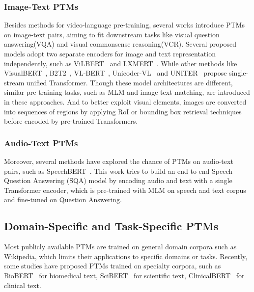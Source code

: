 \documentclass[fleqn]{SCYE-arxiv}
\begin{document}
\begin{multicols}{2}
\subsubsection{Image-Text PTMs}

Besides methods for video-language pre-training, several works introduce PTMs on image-text pairs, aiming to fit downstream tasks like visual question answering(VQA) and visual commonsense reasoning(VCR). Several proposed models adopt two separate encoders for image and text representation independently, such as ViLBERT~\cite{lu2019vilbert} and LXMERT~\cite{DBLP:conf/emnlp/TanB19}. While other methods like VisualBERT~\cite{DBLP:journals/corr/abs-1908-03557}, B2T2~\cite{DBLP:conf/emnlp/AlbertiLCR19}, VL-BERT~\cite{su2020vl-bert}, Unicoder-VL~\cite{li2020unicoder-vl} and UNITER~\cite{DBLP:journals/corr/abs-1909-11740} propose single-stream unified Transformer. Though these model architectures are different, similar pre-training tasks, such as MLM and image-text matching, are introduced in these approaches. And to better exploit visual elements, images are converted into sequences of regions by applying RoI or bounding box retrieval techniques before encoded by pre-trained Transformers.

\subsubsection{Audio-Text PTMs}

Moreover, several methods have explored the chance of PTMs on audio-text pairs, such as SpeechBERT~\cite{DBLP:journals/corr/abs-1910-11559}. This work tries to build an end-to-end Speech Question Answering (SQA) model by encoding audio and text with a single Transformer encoder, which is pre-trained with MLM on speech and text corpus and fine-tuned on Question Answering.


\subsection{Domain-Specific and Task-Specific PTMs}
\label{sec:ptms-domain}


Most publicly available PTMs are trained on general domain corpora such as Wikipedia, which limits their applications to specific domains or tasks. Recently, some studies have proposed PTMs trained on specialty corpora, such as BioBERT~\cite{lee2019biobert} for biomedical text, SciBERT~\cite{beltagy2019scibert} for scientific text, ClinicalBERT~\cite{huang2019clinicalbert,alsentzer2019publicly} for clinical text.


\end{multicols}
\end{document}
